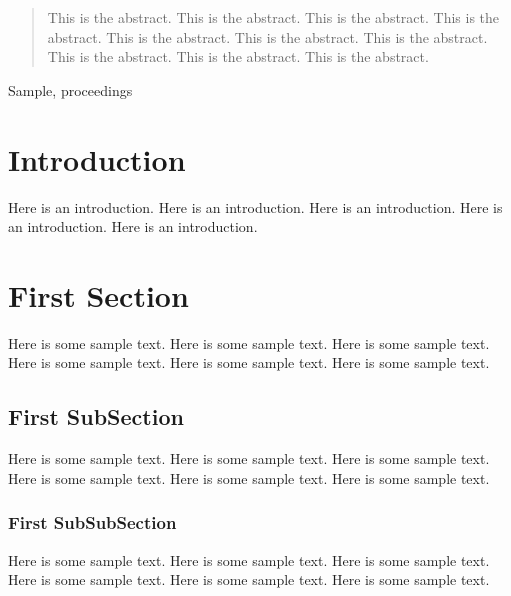 \documentclass{kapproc} %
\begin{document}


\author{First Author}

\author{Second Author}



\begin{abstract}
This is the abstract. This is the abstract.
This is the abstract. This is the abstract.
This is the abstract. This is the abstract.
This is the abstract. This is the abstract.
This is the abstract. This is the abstract.
\end{abstract}

\begin{keywords}
Sample, proceedings
\end{keywords}

\section*{Introduction}
Here is an introduction.
Here is an introduction.
Here is an introduction.
Here is an introduction.
Here is an introduction.

\section{First Section}
Here is some sample text.
Here is some sample text.
Here is some sample text.
Here is some sample text.
Here is some sample text.
Here is some sample text.

\subsection{First SubSection}
Here is some sample text.
Here is some sample text.
Here is some sample text.
Here is some sample text.
Here is some sample text.
Here is some sample text.

\subsubsection{First SubSubSection}
Here is some sample text.
Here is some sample text.
Here is some sample text.
Here is some sample text.
Here is some sample text.
Here is some sample text.
\end{document}

